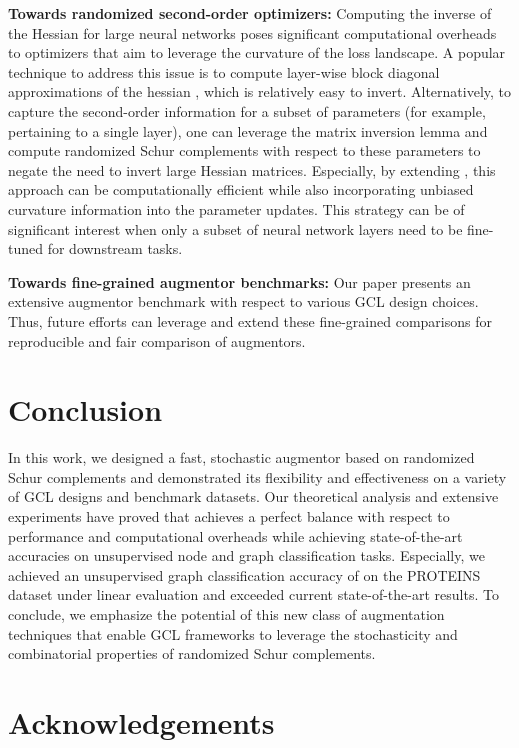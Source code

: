\documentclass{article}
\theoremstyle{plain}
\theoremstyle{definition}
\theoremstyle{remark}
\begin{document}
\textbf{ Towards randomized second-order optimizers:} Computing the inverse of the Hessian for large neural networks poses significant computational overheads to optimizers that aim to leverage the curvature of the loss landscape. A popular technique to address this issue is to compute layer-wise block diagonal approximations of the hessian \citep{martens2015optimizing, osawa2019large, hoefler2021sparsity}, which is relatively easy to invert. Alternatively, to capture the second-order information for a subset of parameters (for example, pertaining to a single layer), one can leverage the matrix inversion lemma and compute randomized Schur complements with respect to these parameters to negate the need to invert large Hessian matrices. Especially, by extending , this approach can be computationally efficient while also incorporating unbiased curvature information into the parameter updates. This strategy can be of significant interest when only a subset of neural network layers need to be fine-tuned for downstream tasks.

\textbf{ Towards fine-grained augmentor benchmarks:} Our paper presents an extensive augmentor benchmark with respect to various GCL design choices. Thus, future efforts can leverage and extend these fine-grained comparisons for reproducible and fair comparison of augmentors.

\section{Conclusion}

In this work, we designed a fast, stochastic augmentor based on randomized Schur complements and demonstrated its flexibility and effectiveness on a variety of GCL designs and benchmark datasets. Our theoretical analysis and extensive experiments have proved that  achieves a perfect balance with respect to performance and computational overheads while achieving state-of-the-art accuracies on unsupervised node and graph classification tasks. Especially, we achieved an unsupervised graph classification accuracy of  on the PROTEINS dataset under linear evaluation and exceeded current state-of-the-art results. To conclude, we emphasize the potential of this new class of augmentation techniques that enable GCL frameworks to leverage the stochasticity and combinatorial properties of randomized Schur complements.

\section*{Acknowledgements}
\end{document}

